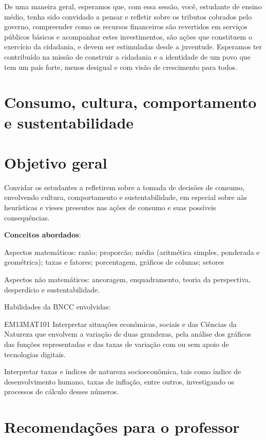 De uma maneira geral, esperamos que, com essa sessão, você, estudante de ensino médio, tenha sido convidado a pensar e refletir sobre os tributos cobrados pelo governo, compreender como os recursos financeiros são revertidos em serviços públicos básicos e acompanhar estes investimentos, são ações que constituem o exercício da cidadania, e devem ser  estimuladas desde a juventude. Esperamos ter contribuído na missão de construir a cidadania e a identidade de um povo que tem um país forte, menos desigual e com visão de crescimento para todos.

\begin{paginatexto2}
\section*{Consumo, cultura, comportamento e sustentabilidade}
\section*{Objetivo geral}

Convidar os estudantes a refletirem sobre a tomada de decisões de consumo, envolvendo cultura, comportamento e sustentabilidade, em especial sobre aàs heurísticas e vieses presentes nas ações de consumo e suas possíveis consequências.

\textbf{Conceitos abordados}: 

Aspectos matemáticos: razão; proporcão; média (aritmética simples, ponderada e geométrica); taxas e fatores; porcentagem, gráficos de colunas; setores

Aspectos não matemáticos: ancoragem, enquadramento, teoria da perspectiva, desperdício e sustentabilidade.

Habilidades da BNCC envolvidas:

\begin{objetivos}{EM13MAT101}
 Interpretar situações econômicas, sociais e das Ciências da Natureza
que envolvem a variação de duas grandezas, pela análise dos gráficos das funções representadas e das taxas de variação com ou sem apoio de tecnologias digitais.


Interpretar taxas e índices de natureza socioeconômica, tais como índice de desenvolvimento humano, taxas de inflação, entre outros, investigando os processos de cálculo desses números.
\end{objetivos}

\section*{Recomendações para o professor}


\end{paginatexto2}
